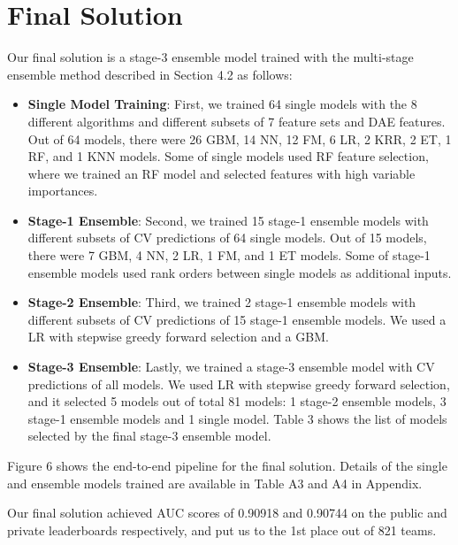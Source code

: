 \section{Final Solution}
Our final solution is a stage-3 ensemble model trained with the multi-stage ensemble method described in Section 4.2 as follows:
\begin{itemize}
  \setlength\itemsep{0em}
  \item \textbf{Single Model Training}: First, we trained 64 single models with the 8 different algorithms and different subsets of 7 feature sets and DAE features.  Out of 64 models, there were 26 GBM, 14 NN, 12 FM, 6 LR, 2 KRR, 2 ET, 1 RF, and 1 KNN models.  Some of single models used RF feature selection, where we trained an RF model and selected features with high variable importances.
  \item \textbf{Stage-1 Ensemble}: Second, we trained 15 stage-1 ensemble models with different subsets of CV predictions of 64 single models.  Out of 15 models, there were 7 GBM, 4 NN, 2 LR, 1 FM, and 1 ET models.  Some of stage-1 ensemble models used rank orders between single models as additional inputs.  
  \item \textbf{Stage-2 Ensemble}: Third, we trained 2 stage-1 ensemble models with different subsets of CV predictions of 15 stage-1 ensemble models.  We used a LR with stepwise greedy forward selection and a GBM.
  \item \textbf{Stage-3 Ensemble}: Lastly, we trained a stage-3 ensemble model with CV predictions of all models.  We used LR with stepwise greedy forward selection, and it selected 5 models out of total 81 models: 1 stage-2 ensemble models, 3 stage-1 ensemble models and 1 single model.  Table 3 shows the list of models selected by the final stage-3 ensemble model.
\end{itemize}

Figure 6 shows the end-to-end pipeline for the final solution.  Details of the single and ensemble models trained are available in Table A3 and A4 in Appendix.

Our final solution achieved AUC scores of 0.90918 and 0.90744 on the public and private leaderboards respectively, and put us to the 1st place out of 821 teams.

